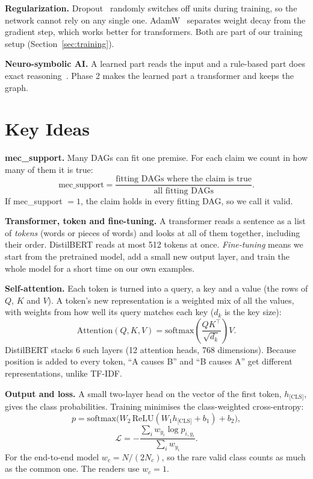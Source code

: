 \documentclass[conference]{IEEEtran}
\begin{document}
\textbf{Regularization.} Dropout~\cite{srivastava2014} randomly switches off units during training, so the network
cannot rely on any single one. AdamW~\cite{loshchilov2019} separates weight decay from the gradient step, which
works better for transformers. Both are part of our training setup (Section~\ref{sec:training}).

\textbf{Neuro-symbolic AI.} A learned part reads the input and a rule-based part does exact
reasoning~\cite{garcez2023}. Phase 2 makes the learned part a transformer and keeps the graph.

\section{Key Ideas}
\label{sec:ideas}
\textbf{mec\_support.} Many DAGs can fit one premise. For each claim we count in how many of them it is true:
\begin{equation}
\text{mec\_support} = \frac{\text{fitting DAGs where the claim is true}}{\text{all fitting DAGs}}.
\end{equation}
If mec\_support $=1$, the claim holds in every fitting DAG, so we call it valid.

\textbf{Transformer, token and fine-tuning.} A transformer reads a sentence as a list of \emph{tokens} (words or
pieces of words) and looks at all of them together, including their order. DistilBERT reads at most 512 tokens at
once. \emph{Fine-tuning} means we start from the pretrained model, add a small new output layer, and train the whole
model for a short time on our own examples.

\textbf{Self-attention.} Each token is turned into a query, a key and a value (the rows of $Q$, $K$ and $V$). A
token's new representation is a weighted mix of all the values, with weights from how well its query matches each
key ($d_k$ is the key size):
\begin{equation}
\mathrm{Attention}(Q,K,V) = \mathrm{softmax}\!\left(\frac{QK^\top}{\sqrt{d_k}}\right)V .
\end{equation}
DistilBERT stacks 6 such layers (12 attention heads, 768 dimensions). Because position is added to every token,
``A causes B'' and ``B causes A'' get different representations, unlike TF-IDF.

\textbf{Output and loss.} A small two-layer head on the vector of the first token, $h_{\text{[CLS]}}$, gives the
class probabilities. Training minimises the class-weighted cross-entropy:
\begin{equation}
p = \mathrm{softmax}\big(W_2\,\mathrm{ReLU}(W_1 h_{\text{[CLS]}} + b_1) + b_2\big),
\end{equation}
\begin{equation}
\mathcal{L} = -\frac{\sum_i w_{y_i}\log p_{i,y_i}}{\sum_i w_{y_i}}.
\end{equation}
For the end-to-end model $w_c = N/(2N_c)$, so the rare valid class counts as much as the common one. The readers
use $w_c = 1$.
\end{document}
